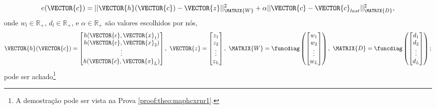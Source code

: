 \begin{theorem}
\begin{equation}\label{eq:maphcxrnr1:2}
e(\VECTOR{c}) =  ||\VECTOR{h}(\VECTOR{c})-\VECTOR{z}||_{\MATRIX{W}}^2 + \alpha||\VECTOR{c}-\VECTOR{c}_{last}||_{\MATRIX{D}}^2,
\end{equation}
onde $w_l \in \mathbb{R}_+$, $d_l \in \mathbb{R}_+$, e $\alpha \in \mathbb{R}_+$ são valores escolhidos por nós,
\begin{equation}
\VECTOR{h}(\VECTOR{c})=\begin{bmatrix}
h(\VECTOR{c},\VECTOR{x}_1)\\ 
h(\VECTOR{c},\VECTOR{x}_2)\\ 
\vdots\\ 
h(\VECTOR{c},\VECTOR{x}_L)
\end{bmatrix},
~
\VECTOR{z}=\begin{bmatrix}
z_1\\ 
z_2\\ 
\vdots\\ 
z_L
\end{bmatrix},
~
\MATRIX{W}=\funcdiag\left(\begin{bmatrix}
w_1\\ 
w_2\\ 
\vdots\\ 
w_L
\end{bmatrix}\right),
~
\MATRIX{D}=\funcdiag\left(\begin{bmatrix}
d_1\\ 
d_2\\ 
\vdots\\ 
d_L
\end{bmatrix}\right);
\end{equation}
pode ser achado\footnote{A demostração pode ser vista na Prova \ref{proof:theo:maphcxrnr1}.} 

\end{theorem}
